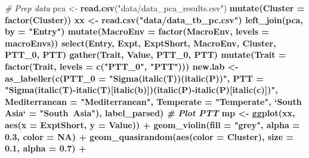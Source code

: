 \documentclass[
]{article}
\newenvironment{Shaded}{\begin{snugshade}}{\end{snugshade}}
\newcommand{\CommentTok}[1]{\textcolor[rgb]{0.56,0.35,0.01}{\textit{#1}}}
\newcommand{\DataTypeTok}[1]{\textcolor[rgb]{0.13,0.29,0.53}{#1}}
\newcommand{\DecValTok}[1]{\textcolor[rgb]{0.00,0.00,0.81}{#1}}
\newcommand{\FloatTok}[1]{\textcolor[rgb]{0.00,0.00,0.81}{#1}}
\newcommand{\KeywordTok}[1]{\textcolor[rgb]{0.13,0.29,0.53}{\textbf{#1}}}
\newcommand{\NormalTok}[1]{#1}
\newcommand{\OperatorTok}[1]{\textcolor[rgb]{0.81,0.36,0.00}{\textbf{#1}}}
\newcommand{\OtherTok}[1]{\textcolor[rgb]{0.56,0.35,0.01}{#1}}
\newcommand{\StringTok}[1]{\textcolor[rgb]{0.31,0.60,0.02}{#1}}
\begin{document}
\begin{Shaded}
\begin{Highlighting}[]
\CommentTok{# Prep data}
\NormalTok{pca <-}\StringTok{ }\KeywordTok{read.csv}\NormalTok{(}\StringTok{"data/data_pca_results.csv"}\NormalTok{) }\OperatorTok{%
\StringTok{  }\KeywordTok{mutate}\NormalTok{(}\DataTypeTok{Cluster =} \KeywordTok{factor}\NormalTok{(Cluster))}
\NormalTok{xx <-}\StringTok{ }\KeywordTok{read.csv}\NormalTok{(}\StringTok{"data/data_tb_pc.csv"}\NormalTok{) }\OperatorTok{%
\StringTok{  }\KeywordTok{left_join}\NormalTok{(pca, }\DataTypeTok{by =} \StringTok{"Entry"}\NormalTok{) }\OperatorTok{%
\StringTok{  }\KeywordTok{mutate}\NormalTok{(}\DataTypeTok{MacroEnv =} \KeywordTok{factor}\NormalTok{(MacroEnv, }\DataTypeTok{levels =}\NormalTok{ macroEnvs)) }\OperatorTok{%
\StringTok{  }\KeywordTok{select}\NormalTok{(Entry, Expt, ExptShort, MacroEnv, Cluster, PTT_}\DecValTok{0}\NormalTok{, PTT) }\OperatorTok{%
\StringTok{  }\KeywordTok{gather}\NormalTok{(Trait, Value, PTT_}\DecValTok{0}\NormalTok{, PTT) }\OperatorTok{%
\StringTok{  }\KeywordTok{mutate}\NormalTok{(}\DataTypeTok{Trait =} \KeywordTok{factor}\NormalTok{(Trait, }\DataTypeTok{levels =} \KeywordTok{c}\NormalTok{(}\StringTok{"PTT_0"}\NormalTok{, }\StringTok{"PTT"}\NormalTok{)))}
\NormalTok{new.lab <-}\StringTok{ }\KeywordTok{as_labeller}\NormalTok{(}\KeywordTok{c}\NormalTok{(}\DataTypeTok{PTT_0 =} \StringTok{"Sigma(italic(T))(italic(P))"}\NormalTok{,}
  \DataTypeTok{PTT =} \StringTok{"Sigma(italic(T)-italic(T)[italic(b)])(italic(P)-italic(P)[italic(c)])"}\NormalTok{, }
  \DataTypeTok{Mediterranean =} \StringTok{"Mediterranean"}\NormalTok{, }\DataTypeTok{Temperate =} \StringTok{"Temperate"}\NormalTok{, }
  \StringTok{`}\DataTypeTok{South Asia}\StringTok{`}\NormalTok{ =}\StringTok{ "South~Asia"}\NormalTok{), label_parsed)}
\CommentTok{# Plot PTT}
\NormalTok{mp <-}\StringTok{ }\KeywordTok{ggplot}\NormalTok{(xx, }\KeywordTok{aes}\NormalTok{(}\DataTypeTok{x =}\NormalTok{ ExptShort, }\DataTypeTok{y =}\NormalTok{ Value)) }\OperatorTok{+}
\StringTok{  }\KeywordTok{geom_violin}\NormalTok{(}\DataTypeTok{fill =} \StringTok{"grey"}\NormalTok{, }\DataTypeTok{alpha =} \FloatTok{0.3}\NormalTok{, }\DataTypeTok{color =} \OtherTok{NA}\NormalTok{) }\OperatorTok{+}\StringTok{ }
\StringTok{  }\KeywordTok{geom_quasirandom}\NormalTok{(}\KeywordTok{aes}\NormalTok{(}\DataTypeTok{color =}\NormalTok{ Cluster), }\DataTypeTok{size =} \FloatTok{0.1}\NormalTok{, }\DataTypeTok{alpha =} \FloatTok{0.7}\NormalTok{) }\OperatorTok{+}\StringTok{ }
}}}}}}
\end{Highlighting}
\end{Shaded}
\end{document}

